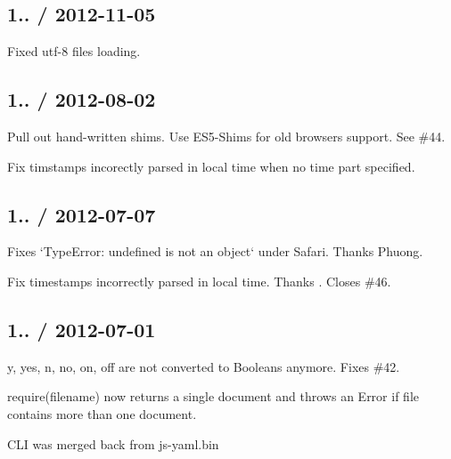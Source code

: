 \subsection*{1.. / 2012-\/11-\/05 }


\begin{DoxyItemize}
\item Fixed utf-\/8 files loading.
\end{DoxyItemize}

\subsection*{1.. / 2012-\/08-\/02 }


\begin{DoxyItemize}
\item Pull out hand-\/written shims. Use E\+S5-\/\+Shims for old browsers support. See \#44.
\item Fix timstamps incorectly parsed in local time when no time part specified.
\end{DoxyItemize}

\subsection*{1.. / 2012-\/07-\/07 }


\begin{DoxyItemize}
\item Fixes `\+Type\+Error\+: \textquotesingle{}undefined\textquotesingle{} is not an object` under Safari. Thanks Phuong.
\item Fix timestamps incorrectly parsed in local time. Thanks . Closes \#46.
\end{DoxyItemize}

\subsection*{1.. / 2012-\/07-\/01 }


\begin{DoxyItemize}
\item {\ttfamily y}, {\ttfamily yes}, {\ttfamily n}, {\ttfamily no}, {\ttfamily on}, {\ttfamily off} are not converted to Booleans anymore. Fixes \#42.
\item {\ttfamily require(filename)} now returns a single document and throws an Error if file contains more than one document.
\item C\+LI was merged back from js-\/yaml.\+bin
\end{DoxyItemize}

